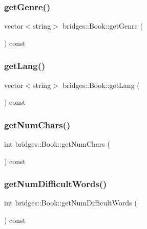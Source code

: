 \subsubsection{\texorpdfstring{getGenre()}{getGenre()}}
{\footnotesize\ttfamily vector$<$string$>$ bridges\+::\+Book\+::get\+Genre (\begin{DoxyParamCaption}{ }\end{DoxyParamCaption}) const\hspace{0.3cm}{\ttfamily [inline]}}

\mbox{\label{classbridges_1_1_book_a946923e7d93c552f699ef44a5bbed643}} 
\subsubsection{\texorpdfstring{getLang()}{getLang()}}
{\footnotesize\ttfamily vector$<$string$>$ bridges\+::\+Book\+::get\+Lang (\begin{DoxyParamCaption}{ }\end{DoxyParamCaption}) const\hspace{0.3cm}{\ttfamily [inline]}}

\mbox{\label{classbridges_1_1_book_a96343d553aeadefe8aa88da3e1e9e635}} 
\subsubsection{\texorpdfstring{getNumChars()}{getNumChars()}}
{\footnotesize\ttfamily int bridges\+::\+Book\+::get\+Num\+Chars (\begin{DoxyParamCaption}{ }\end{DoxyParamCaption}) const\hspace{0.3cm}{\ttfamily [inline]}}

\mbox{\label{classbridges_1_1_book_a6a2622b9eee31c4abd222282f72e641c}} 
\subsubsection{\texorpdfstring{getNumDifficultWords()}{getNumDifficultWords()}}
{\footnotesize\ttfamily int bridges\+::\+Book\+::get\+Num\+Difficult\+Words (\begin{DoxyParamCaption}{ }\end{DoxyParamCaption}) const\hspace{0.3cm}{\ttfamily [inline]}}

